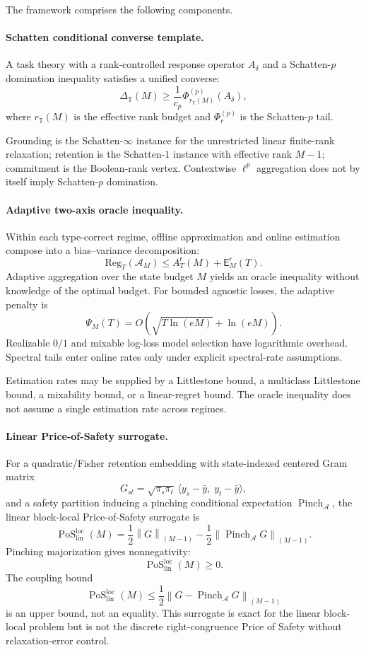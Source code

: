 \documentclass[12pt]{article}
\theoremstyle{definition}
\DeclareMathOperator{\PoS}{PoS}
\newcommand{\Reg}{\mathrm{Reg}}
\newcommand{\Est}{\mathsf E}
\newcommand{\Aapp}{A_T}
\newcommand{\PsiAgg}{\Psi}
\newcommand{\EA}{\operatorname{Pinch}_{\mathcal A}}
\newcommand{\KyF}[2]{\left\|#1\right\|_{(#2)}}
\newcommand{\PoSlin}{\PoS_{\mathrm{lin}}^{\mathrm{loc}}}
\begin{document}
The framework comprises the following components.

\paragraph{Schatten conditional converse template.}
A task theory with a rank-controlled response operator $A_\delta$ and a
Schatten-$p$ domination inequality satisfies a unified converse:
\[
\Delta_{\mathbb T}(M)
\ge
\frac1{c_p}
\Phi^{(p)}_{r_{\mathbb T}(M)}(A_\delta),
\]
where $r_{\mathbb T}(M)$ is the effective rank budget and
$\Phi^{(p)}_r$ is the Schatten-$p$ tail.

Grounding is the Schatten-$\infty$ instance for the unrestricted linear
finite-rank relaxation; retention is the Schatten-$1$ instance with effective
rank $M-1$; commitment is the Boolean-rank vertex.  Contextwise $\ell^p$
aggregation does not by itself imply Schatten-$p$ domination.

\paragraph{Adaptive two-axis oracle inequality.}
Within each type-correct regime, offline approximation and online estimation
compose into a bias--variance decomposition:
\[
\Reg_T(\mathcal A_M)
\le
\Aapp^{\mathsf r}(M)
+
\Est_M^{\mathsf r}(T).
\]
Adaptive aggregation over the state budget $M$ yields an oracle inequality
without knowledge of the optimal budget.  For bounded agnostic losses, the
adaptive penalty is
\[
\PsiAgg_M(T)
=
O\!\left(
\sqrt{T\ln(eM)}
+
\ln(eM)
\right).
\]
Realizable $0/1$ and mixable log-loss model selection have logarithmic
overhead.  Spectral tails enter online rates only under explicit spectral-rate
assumptions.

Estimation rates may be supplied by a Littlestone bound, a multiclass
Littlestone bound, a mixability bound, or a linear-regret bound.  The oracle
inequality does not assume a single estimation rate across regimes.

\paragraph{Linear Price-of-Safety surrogate.}
For a quadratic/Fisher retention embedding with state-indexed centered Gram
matrix
\[
G_{st}
=
\sqrt{\pi_s\pi_t}\,
\langle y_s-\bar y,\;y_t-\bar y\rangle,
\]
and a safety partition inducing a pinching conditional expectation
$\EA$, the linear block-local Price-of-Safety surrogate is
\[
\PoSlin(M)
=
\frac12\KyF{G}{M-1}
-
\frac12\KyF{\EA G}{M-1}.
\]
Pinching majorization gives nonnegativity:
\[
\PoSlin(M)\ge0.
\]
The coupling bound
\[
\PoSlin(M)
\le
\frac12\KyF{G-\EA G}{M-1}
\]
is an upper bound, not an equality.  This surrogate is exact for the linear
block-local problem but is not the discrete right-congruence Price of Safety
without relaxation-error control.
\end{document}
